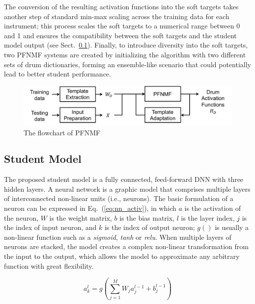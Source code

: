 \documentclass{article}
\begin{document}
The conversion of the resulting activation functions into the soft targets takes another step of standard min-max scaling across the training data for each instrument; this process scales the soft targets to a numerical range between 0 and 1 and ensures the compatibility between the soft targets and the student model output (see Sect.~\ref{subsec:nn}). Finally, to introduce diversity into the soft targets, two PFNMF systems are created by initializing the algorithm with two different sets of drum dictionaries, forming an ensemble-like scenario that could potentially lead to better student performance. %

\begin{figure}
\centering
\includegraphics[width = 8 cm]{./figs/nmf_flowchart_remake.pdf}
\caption{The flowchart of PFNMF \cite{Wu2015a}}
\label{fig:pfnmf}
\end{figure}

\subsection{Student Model}\label{subsec:nn}
The proposed student model is a fully connected, feed-forward DNN with three hidden layers. A neural network is a graphic model that comprises multiple layers of interconnected non-linear units (i.e., neurons). The basic formulation of a neuron can be expressed in Eq.~(\ref{eq:nn_activ}), in which $a$ is the activation of the neuron, $W$ is the weight matrix, $b$ is the bias matrix, $l$ is the layer index, $j$ is the index of input neuron, and $k$ is the index of output neuron; $g( )$ is usually a non-linear function such as a \textit{sigmoid}, \textit{tanh} or \textit{relu}. When multiple layers of neurons are stacked, the model creates a complex non-linear transformation from the input to the output, which allows the model to approximate any arbitrary function with great flexibility. 

\begin{equation}\label{eq:nn_activ}
a_{k}^{l} = g\left( \sum_{j=1}^{M} W_{j} a_{j}^{l-1} + b_{j}^{l-1}\right)
\end{equation}
\end{document}
